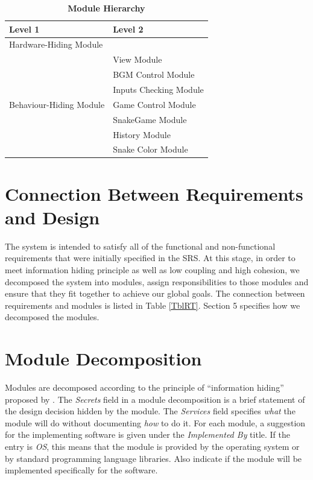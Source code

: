 \documentclass[12pt, titlepage]{article}
\begin{document}
\begin{table}[h!]
\centering
\begin{tabular}{p{} p{}}
\toprule
\textbf{Level 1} & \textbf{Level 2}\\
\midrule

{Hardware-Hiding Module} & ~ \\
\midrule

\multirow{7}{0.3\textwidth}{Behaviour-Hiding Module} & View Module\\
& BGM Control Module\\
& Inputs Checking Module\\
& Game Control Module\\
\midrule

\multirow{3}{0.3\textwidth}{Software Decision Module} & SnakeGame Module\\
& History Module\\
& Snake Color Module\\
\bottomrule

\end{tabular}
\caption{\textbf{Module Hierarchy}}
\label{TblMH}
\end{table}


\section{Connection Between Requirements and Design} \label{SecConnection}

The system is intended to satisfy all of the functional and non-functional requirements that were initially specified in the SRS. At this stage, in order to meet information hiding principle as well as low coupling and high cohesion, we decomposed the system into modules, assign responsibilities to those modules and ensure that they fit together to achieve our global goals. The connection
between requirements and modules is listed in Table \ref{TblRT}. Section 5 specifies how we decomposed the modules.

\section{Module Decomposition} \label{SecMD}

Modules are decomposed according to the principle of ``information hiding''
proposed by \citet{ParnasEtAl1984}. The \emph{Secrets} field in a module
decomposition is a brief statement of the design decision hidden by the
module. The \emph{Services} field specifies \emph{what} the module will do
without documenting \emph{how} to do it. For each module, a suggestion for the
implementing software is given under the \emph{Implemented By} title. If the
entry is \emph{OS}, this means that the module is provided by the operating
system or by standard programming language libraries.  Also indicate if the
module will be implemented specifically for the software.
\end{document}
